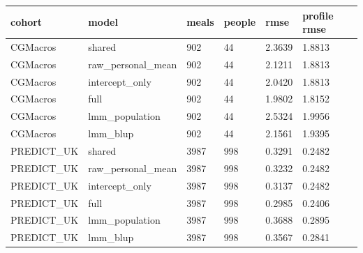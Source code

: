 {\footnotesize\setlength{\tabcolsep}{3pt}
\begin{longtable}{llllll}
\toprule
\textbf{cohort} & \textbf{model} & \textbf{meals} & \textbf{people} & \textbf{rmse} & \textbf{profile rmse} \\
\midrule
\endhead
CGMacros & shared & 902 & 44 & 2.3639 & 1.8813 \\
CGMacros & raw\_personal\_mean & 902 & 44 & 2.1211 & 1.8813 \\
CGMacros & intercept\_only & 902 & 44 & 2.0420 & 1.8813 \\
CGMacros & full & 902 & 44 & 1.9802 & 1.8152 \\
CGMacros & lmm\_population & 902 & 44 & 2.5324 & 1.9956 \\
CGMacros & lmm\_blup & 902 & 44 & 2.1561 & 1.9395 \\
PREDICT\_UK & shared & 3987 & 998 & 0.3291 & 0.2482 \\
PREDICT\_UK & raw\_personal\_mean & 3987 & 998 & 0.3232 & 0.2482 \\
PREDICT\_UK & intercept\_only & 3987 & 998 & 0.3137 & 0.2482 \\
PREDICT\_UK & full & 3987 & 998 & 0.2985 & 0.2406 \\
PREDICT\_UK & lmm\_population & 3987 & 998 & 0.3688 & 0.2895 \\
PREDICT\_UK & lmm\_blup & 3987 & 998 & 0.3567 & 0.2841 \\
\bottomrule
\end{longtable}}
